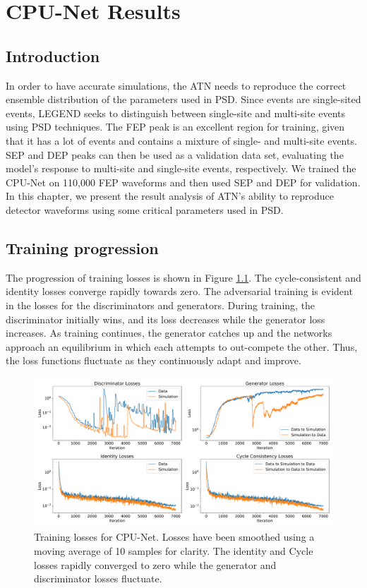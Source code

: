 \chapter{CPU-Net Results}\label{chap:cpu-net_result}

\section{Introduction}

In order to have accurate simulations, the ATN needs to reproduce the correct ensemble distribution of the parameters used in PSD. Since {\onbb} events are single-sited events, LEGEND seeks to distinguish between single-site and multi-site events using PSD techniques. The FEP peak is an excellent region for training, given that it has a lot of events and contains a mixture of single- and multi-site events. SEP and DEP peaks can then be used as a validation data set, evaluating the model's response to multi-site and single-site events, respectively. We trained the CPU-Net on 110,000 FEP waveforms and then used SEP and DEP for validation. In this chapter, we present the result analysis of ATN's ability to reproduce detector waveforms using some critical parameters used in PSD. 



\section{Training progression}
The progression of training losses is shown in Figure \ref{fig:training_loss}. The cycle-consistent and identity losses converge rapidly towards zero. The adversarial training is evident in the losses for the discriminators and generators. During training, the discriminator initially wins, and its loss decreases while the generator loss increases. As training continues, the generator catches up and the networks approach an equilibrium in which each attempts to out-compete the other. Thus, the loss functions fluctuate as they continuously adapt and improve.


\begin{figure}%
    \includegraphics[width=0.99\linewidth]{ch8/figs/loss_funcs.pdf}
    \caption{Training losses for CPU-Net. Losses have been smoothed using a moving average of 10 samples for clarity. The identity and Cycle losses rapidly converged to zero while the generator and discriminator losses fluctuate.} 
   \label{fig:training_loss}
\end{figure}

